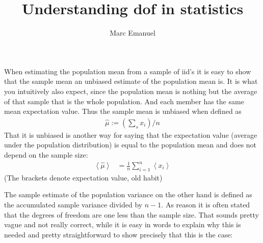 \documentclass[a4paper,10pt]{article}
\title{Understanding dof in statistics}
\author{Marc Emanuel}
\newcommand{\vev}[1]{ \left\langle #1 \right\rangle}
\begin{document}
\maketitle
When estimating the population mean from a sample of iid's it is easy to show that  the sample mean an unbiased estimate of the population mean is. It is what you intuitively also expect, since the population mean is nothing but the average of that sample that is the whole population. And each member has the same mean expectation value. Thus the sample mean is unbiased when defined as 
\begin{align}
\hat{\mu}:=(\sum_s x_i )/n  \label{eq:meansamp}
\end{align}
That it is unbiased is another way for saying that the expectation value (average under the population distribution) is equal to the population mean and does not depend on the sample size:
\begin{align*}
  \vev{\hat{\mu}}&=\frac{1}{n} \sum_{i=1}^n\vev{x_i} 
\end{align*}
(The brackets denote expectation value, old habit)

The sample estimate of the population variance  on the other hand is defined as the accumulated sample variance divided by $n-1$. As  reason  it is often stated that the degrees of freedom are one less than the sample size. That sounds pretty vague and not really correct, while it is easy in words to explain why this is needed and pretty straightforward to show precisely that this is the case:
\end{document}
